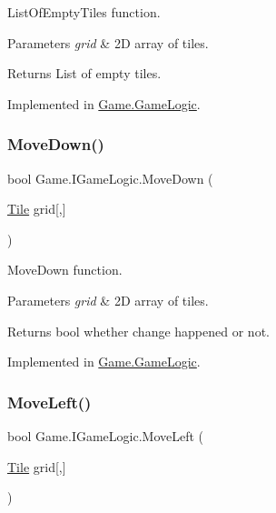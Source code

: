 List\+Of\+Empty\+Tiles function. 


\begin{DoxyParams}{Parameters}
{\em grid} & 2D array of tiles.\\
\hline
\end{DoxyParams}
\begin{DoxyReturn}{Returns}
List of empty tiles.
\end{DoxyReturn}


Implemented in \mbox{\hyperlink{class_game_1_1_game_logic_a9c5ad5f88426ff3f53252c41611b5ab2}{Game.\+Game\+Logic}}.

\mbox{\label{interface_game_1_1_i_game_logic_ae4106eb97e72a42e76fd0d286fd7b10b}} 
\subsubsection{\texorpdfstring{MoveDown()}{MoveDown()}}
{\footnotesize\ttfamily bool Game.\+I\+Game\+Logic.\+Move\+Down (\begin{DoxyParamCaption}\item[{\mbox{\hyperlink{class_game_1_1_tile}{Tile}}}]{grid\mbox{[},\mbox{]} }\end{DoxyParamCaption})}



Move\+Down function. 


\begin{DoxyParams}{Parameters}
{\em grid} & 2D array of tiles.\\
\hline
\end{DoxyParams}
\begin{DoxyReturn}{Returns}
bool whether change happened or not.
\end{DoxyReturn}


Implemented in \mbox{\hyperlink{class_game_1_1_game_logic_ae7032504eaee895fdce17c64490c0a52}{Game.\+Game\+Logic}}.

\mbox{\label{interface_game_1_1_i_game_logic_abae3146afb71b9b144c13b189a26fb17}} 
\subsubsection{\texorpdfstring{MoveLeft()}{MoveLeft()}}
{\footnotesize\ttfamily bool Game.\+I\+Game\+Logic.\+Move\+Left (\begin{DoxyParamCaption}\item[{\mbox{\hyperlink{class_game_1_1_tile}{Tile}}}]{grid\mbox{[},\mbox{]} }\end{DoxyParamCaption})}



